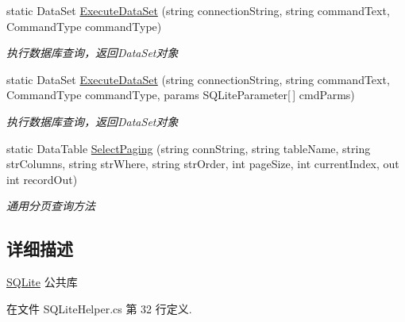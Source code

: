 \begin{DoxyCompactItemize}
static Data\-Set \hyperlink{class_x_c_l_net_tools_1_1_data_base_1_1_s_q_lite_1_1_s_q_lite_helper_a4806433651289941b9507696bb3a64d0}{Execute\-Data\-Set} (string connection\-String, string command\-Text, Command\-Type command\-Type)
\begin{DoxyCompactList}\small\item\em 执行数据库查询，返回\-Data\-Set对象 \end{DoxyCompactList}\item 
static Data\-Set \hyperlink{class_x_c_l_net_tools_1_1_data_base_1_1_s_q_lite_1_1_s_q_lite_helper_a58876af7deacc80974cddb8b1feddee5}{Execute\-Data\-Set} (string connection\-String, string command\-Text, Command\-Type command\-Type, params S\-Q\-Lite\-Parameter\mbox{[}$\,$\mbox{]} cmd\-Parms)
\begin{DoxyCompactList}\small\item\em 执行数据库查询，返回\-Data\-Set对象 \end{DoxyCompactList}\item 
static Data\-Table \hyperlink{class_x_c_l_net_tools_1_1_data_base_1_1_s_q_lite_1_1_s_q_lite_helper_ac6c40082dce532c8ea61efc23c00a825}{Select\-Paging} (string conn\-String, string table\-Name, string str\-Columns, string str\-Where, string str\-Order, int page\-Size, int current\-Index, out int record\-Out)
\begin{DoxyCompactList}\small\item\em 通用分页查询方法 \end{DoxyCompactList}\end{DoxyCompactItemize}


\subsection{详细描述}
\hyperlink{namespace_x_c_l_net_tools_1_1_data_base_1_1_s_q_lite}{S\-Q\-Lite} 公共库 



在文件 S\-Q\-Lite\-Helper.\-cs 第 32 行定义.



